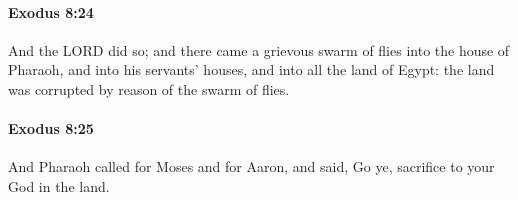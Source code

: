 		\paragraph{Exodus 8:24} %
			\label{EXODUS-8-24}

			And the LORD did so; and there came a grievous swarm of flies into the house of Pharaoh, and into his servants' houses, and into all the land of Egypt: the land was corrupted by reason of the swarm of flies.


		\paragraph{Exodus 8:25} %
			\label{EXODUS-8-25}

			And Pharaoh called for Moses and for Aaron, and said, Go ye, sacrifice to your God in the land.


